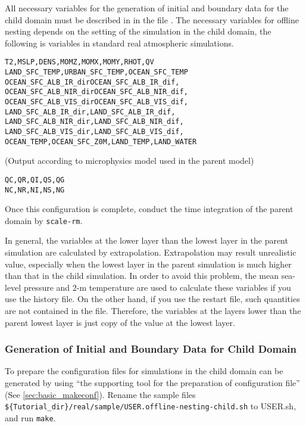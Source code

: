 All necessary variables for the generation of initial and boundary data for the child domain must be described in  in the file \runconf.
The necessary variables for offline nesting depends on the setting of the simulation in the child domain, the following is variables in standard real atmospheric simulations.
\begin{alltt}
  T2, MSLP, DENS, MOMZ, MOMX, MOMY, RHOT, QV
  LAND_SFC_TEMP, URBAN_SFC_TEMP, OCEAN_SFC_TEMP
  OCEAN_SFC_ALB_IR_dir OCEAN_SFC_ALB_IR_dif,
  OCEAN_SFC_ALB_NIR_dir OCEAN_SFC_ALB_NIR_dif,
  OCEAN_SFC_ALB_VIS_dir OCEAN_SFC_ALB_VIS_dif,
  LAND_SFC_ALB_IR_dir, LAND_SFC_ALB_IR_dif,
  LAND_SFC_ALB_NIR_dir, LAND_SFC_ALB_NIR_dif,
  LAND_SFC_ALB_VIS_dir, LAND_SFC_ALB_VIS_dif,
  OCEAN_TEMP, OCEAN_SFC_Z0M, LAND_TEMP, LAND_WATER
\end{alltt}
(Output according to microphysics model used in the parent model)
\begin{alltt}
  QC, QR, QI, QS, QG
  NC, NR, NI, NS, NG
\end{alltt}
Once this configuration is complete, conduct the time integration of the parent domain by \verb|scale-rm|.


In general, the variables at the lower layer than the lowest layer in the parent simulation are calculated by extrapolation.
Extrapolation may result unrealistic value, especially when the lowest layer in the parent simulation is much higher than that in the child simulation.
In order to avoid this problem, the mean sea-level pressure and 2-m temperature are used to calculate these variables if you use the history file.
On the other hand, if you use the restart file, such quantities are not contained in the file.
Therefore, the variables at the layers lower than the parent lowest layer is just copy of the value at the lowest layer.

\subsubsection{Generation of Initial and Boundary Data for Child Domain}


To prepare the configuration files for simulations in the child domain can be generated by using ``the supporting tool for the preparation of configuration file'' (See \ref{sec:basic_makeconf}).
Rename the sample files \\ \verb|${Tutorial_dir}/real/sample/USER.offline-nesting-child.sh| to USER.sh, and run \verb|make|.

